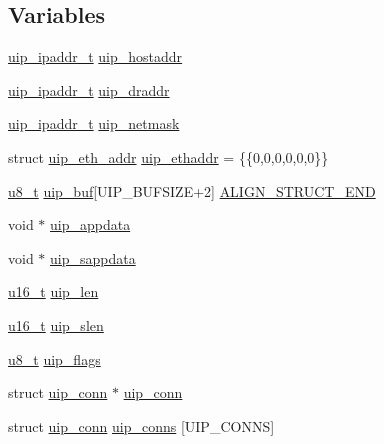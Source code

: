 \subsection*{Variables}
\begin{DoxyCompactItemize}
\item 
\hyperlink{group__uip_ga1ef35301f43a5bbb9f89f07b5a36b9a0}{uip\_\-ipaddr\_\-t} \hyperlink{group__uip_ga7d3673f52f5846b6961d23b150decd54}{uip\_\-hostaddr}
\item 
\hyperlink{group__uip_ga1ef35301f43a5bbb9f89f07b5a36b9a0}{uip\_\-ipaddr\_\-t} \hyperlink{group__uip_ga20df5c82f2a15a508c19e505b5d9de2b}{uip\_\-draddr}
\item 
\hyperlink{group__uip_ga1ef35301f43a5bbb9f89f07b5a36b9a0}{uip\_\-ipaddr\_\-t} \hyperlink{group__uip_ga3237be0d9ec457de0177689ee23c0d5c}{uip\_\-netmask}
\item 
struct \hyperlink{structuip__eth__addr}{uip\_\-eth\_\-addr} \hyperlink{group__uip_ga499bb98a0b4ae9a98553ede81317606d}{uip\_\-ethaddr} = \{\{0,0,0,0,0,0\}\}
\item 
\hyperlink{group__uipfw_ga4caecabca98b43919dd11be1c0d4cd8e}{u8\_\-t} \hyperlink{group__uipdevfunc_gab81e78f890dbbee50c533a9734b74fd9}{uip\_\-buf}\mbox{[}UIP\_\-BUFSIZE+2\mbox{]} \hyperlink{group__uip_gaae09fef3a4ae13ad85a537d46c55f201}{ALIGN\_\-STRUCT\_\-END}
\item 
void $\ast$ \hyperlink{group__uip_ga561b8eda32e059d4e7397f776268cc63}{uip\_\-appdata}
\item 
void $\ast$ \hyperlink{group__uip_gaa05a3dde2048480fa3ab2a5961898d18}{uip\_\-sappdata}
\item 
\hyperlink{group__uipfw_ga77570ac4fcab86864fa1916e55676da2}{u16\_\-t} \hyperlink{group__uip_ga12a33f0c09711167bdf3dd7d7cf8c5a1}{uip\_\-len}
\item 
\hyperlink{group__uipfw_ga77570ac4fcab86864fa1916e55676da2}{u16\_\-t} \hyperlink{group__uip_ga5b5615dc240daed20949c0fded2b4679}{uip\_\-slen}
\item 
\hyperlink{group__uipfw_ga4caecabca98b43919dd11be1c0d4cd8e}{u8\_\-t} \hyperlink{group__uip_gab4ef6b00924990e7a293f66715b6d1d1}{uip\_\-flags}
\item 
struct \hyperlink{structuip__conn}{uip\_\-conn} $\ast$ \hyperlink{group__uip_ga788ffac72342f6172343d7f8099cbe1a}{uip\_\-conn}
\item 
struct \hyperlink{structuip__conn}{uip\_\-conn} \hyperlink{group__uip_gaf703683056d2bfa5c81fa157dcb20fe2}{uip\_\-conns} \mbox{[}UIP\_\-CONNS\mbox{]}
\item 

\end{DoxyCompactItemize}
